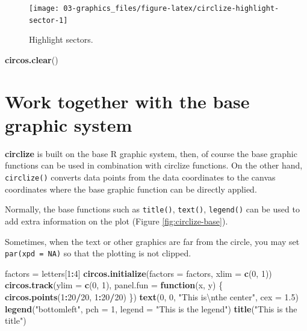 \documentclass[]{book}
\newenvironment{Shaded}{\begin{snugshade}}{\end{snugshade}}
\newcommand{\KeywordTok}[1]{\textcolor[rgb]{0.13,0.29,0.53}{\textbf{#1}}}
\newcommand{\DataTypeTok}[1]{\textcolor[rgb]{0.13,0.29,0.53}{#1}}
\newcommand{\DecValTok}[1]{\textcolor[rgb]{0.00,0.00,0.81}{#1}}
\newcommand{\FloatTok}[1]{\textcolor[rgb]{0.00,0.00,0.81}{#1}}
\newcommand{\CharTok}[1]{\textcolor[rgb]{0.31,0.60,0.02}{#1}}
\newcommand{\StringTok}[1]{\textcolor[rgb]{0.31,0.60,0.02}{#1}}
\newcommand{\ControlFlowTok}[1]{\textcolor[rgb]{0.13,0.29,0.53}{\textbf{#1}}}
\newcommand{\OperatorTok}[1]{\textcolor[rgb]{0.81,0.36,0.00}{\textbf{#1}}}
\newcommand{\NormalTok}[1]{#1}
\begin{document}
\begin{figure}

{\centering \texttt{[image: 03-graphics\_files/figure-latex/circlize-highlight-sector-1]} 

}

\caption{Highlight sectors.}\label{fig:circlize-highlight-sector}
\end{figure}

\begin{Shaded}
\begin{Highlighting}[]
\KeywordTok{circos.clear}\NormalTok{()}
\end{Highlighting}
\end{Shaded}

\section{Work together with the base graphic
system}\label{work-with-base-graphic-system}

\textbf{circlize} is built on the base R graphic system, then, of course
the base graphic functions can be used in combination with circlize
functions. On the other hand, \texttt{circlize()} converts data points
from the data coordinates to the canvas coordinates where the base
graphic function can be directly applied.

Normally, the base functions such as \texttt{title()}, \texttt{text()},
\texttt{legend()} can be used to add extra information on the plot
(Figure \ref{fig:circlize-base}).

Sometimes, when the text or other graphics are far from the circle, you
may set \texttt{par(xpd\ =\ NA)} so that the plotting is not clipped.

\begin{Shaded}
\begin{Highlighting}[]
\NormalTok{factors =}\StringTok{ }\NormalTok{letters[}\DecValTok{1}\OperatorTok{:}\DecValTok{4}\NormalTok{]}
\KeywordTok{circos.initialize}\NormalTok{(}\DataTypeTok{factors =}\NormalTok{ factors, }\DataTypeTok{xlim =} \KeywordTok{c}\NormalTok{(}\DecValTok{0}\NormalTok{, }\DecValTok{1}\NormalTok{))}
\KeywordTok{circos.track}\NormalTok{(}\DataTypeTok{ylim =} \KeywordTok{c}\NormalTok{(}\DecValTok{0}\NormalTok{, }\DecValTok{1}\NormalTok{), }\DataTypeTok{panel.fun =} \ControlFlowTok{function}\NormalTok{(x, y) \{}
    \KeywordTok{circos.points}\NormalTok{(}\DecValTok{1}\OperatorTok{:}\DecValTok{20}\OperatorTok{/}\DecValTok{20}\NormalTok{, }\DecValTok{1}\OperatorTok{:}\DecValTok{20}\OperatorTok{/}\DecValTok{20}\NormalTok{)}
\NormalTok{\})}
\KeywordTok{text}\NormalTok{(}\DecValTok{0}\NormalTok{, }\DecValTok{0}\NormalTok{, }\StringTok{"This is}\CharTok{\textbackslash{}n}\StringTok{the center"}\NormalTok{, }\DataTypeTok{cex =} \FloatTok{1.5}\NormalTok{)}
\KeywordTok{legend}\NormalTok{(}\StringTok{"bottomleft"}\NormalTok{, }\DataTypeTok{pch =} \DecValTok{1}\NormalTok{, }\DataTypeTok{legend =} \StringTok{"This is the legend"}\NormalTok{)}
\KeywordTok{title}\NormalTok{(}\StringTok{"This is the title"}\NormalTok{)}
\end{Highlighting}
\end{Shaded}
\end{document}
